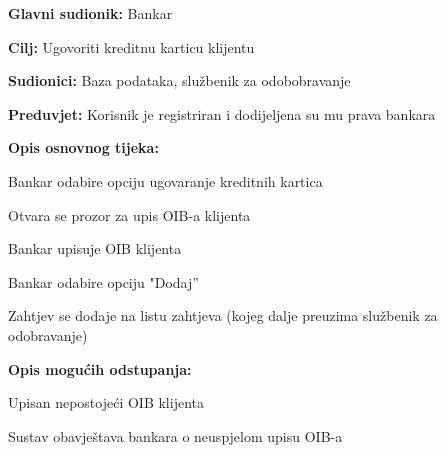                 \noindent {}
                \begin{packed_item}
                
                  \item \textbf{Glavni sudionik: }Bankar
                  \item  \textbf{Cilj:} Ugovoriti kreditnu karticu klijentu
                  \item  \textbf{Sudionici:} Baza podataka, službenik za odobobravanje
                  \item  \textbf{Preduvjet:} Korisnik je registriran i dodijeljena su mu prava bankara
                  \item  \textbf{Opis osnovnog tijeka:}
                  
                  \item[] \begin{packed_enum}
                
                    \item Bankar odabire opciju ugovaranje kreditnih kartica
                    \item Otvara se prozor za upis OIB-a klijenta
                    \item Bankar upisuje OIB klijenta
                    \item Bankar odabire  opciju "Dodaj”
                    \item Zahtjev se dodaje na listu zahtjeva (kojeg dalje preuzima službenik za odobravanje) 
                  \end{packed_enum}
                  
                  \item  \textbf{Opis mogućih odstupanja:}
                  
                  \item[] \begin{packed_item}
                
                    \item[2.a] Upisan nepostojeći OIB klijenta
                    \item[] \begin{packed_enum}
                      
                      \item Sustav obavještava bankara o neuspjelom upisu OIB-a
                      
                    \end{packed_enum}
                    
                  \end{packed_item}
                \end{packed_item}
                
